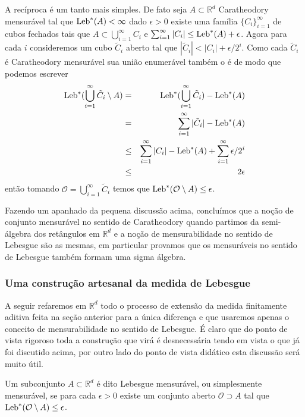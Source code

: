 A recíproca é um tanto mais simples. De fato seja 
$A\subset \mathbb{R}^d$ Caratheodory mensurável 
tal que $\textnormal{Leb}^{*}(A)<\infty$ dado $\epsilon>0$  
existe uma família $\{C_i\}_{i=1}^{\infty}$ de 
cubos fechados tais que 
$A\subset \bigcup_{i=1}^{\infty}C_i$ e 
$\sum_{i=1}^{\infty}|C_i|\leq \textnormal{Leb}^{*}(A)+\epsilon$.
Agora para cada $i$ consideremos um cubo $\tilde{C}_i$ aberto 
tal que $|\tilde{C}_i|<|C_i|+\epsilon/2^{i}.$
Como cada $\tilde{C}_i$ é Caratheodory mensurável sua 
união enumerável também o é de modo que podemos escrever 
\begin{eqnarray*}
\textnormal{Leb}^{*}(\bigcup_{i=1}^{\infty} \tilde{C}_i\setminus A)
&=&
\textnormal{Leb}^{*}(\bigcup_{i=1}^{\infty} \tilde{C}_i)-\textnormal{Leb}^{*}(A)
\\
&
=
&
\sum_{i=1}^{\infty}|\tilde{C}_i|-\textnormal{Leb}^{*}(A)
\\
&
\leq 
&
\sum_{i=1}^{\infty}|C_i|-\textnormal{Leb}^{*}(A)+\sum_{i=1}^{\infty}\epsilon/2^i
\\
&
\leq 
&
2\epsilon
\end{eqnarray*}
então tomando  $\mathcal{O}=\bigcup_{i=1}^{\infty}\tilde{C}_i$ 
temos que $\textnormal{Leb}^{*}(\mathcal{O}\setminus A)\leq \epsilon$.
 
Fazendo um apanhado da pequena discussão acima, 
concluímos que a noção de conjunto mensurável no 
sentido de Caratheodory quando partimos da semi-álgebra 
dos retângulos em $\mathbb{R}^d$ e a noção de mensurabilidade
no sentido de Lebesgue são as mesmas, 
em particular provamos que os mensuráveis no 
sentido de Lebesgue também formam uma sigma álgebra.




\subsubsection{Uma construção artesanal da medida de Lebesgue}

A seguir refaremos em $\mathbb{R}^d$ todo o processo 
de extensão da medida finitamente aditiva feita na 
seção anterior para a única diferença e que 
usaremos apenas o conceito de mensurabilidade 
no sentido de Lebesgue.
É claro que do ponto de vista 
rigoroso toda a construção que virá é 
desnecessária tendo em vista o que já foi discutido acima, 
por outro lado do ponto de vista didático esta 
discussão será  muito útil.









\begin{definicao}
Um subconjunto $A\subset \mathbb{R}^d$ é dito 
Lebesgue mensurável, ou simplesmente mensurável,  
se para cada $\epsilon>0$ existe um 
conjunto aberto $\mathcal{O}\supset A$ 
tal que $\textnormal{Leb}^{*}(\mathcal{O}\setminus A)\leq \epsilon$.
\end{definicao}


